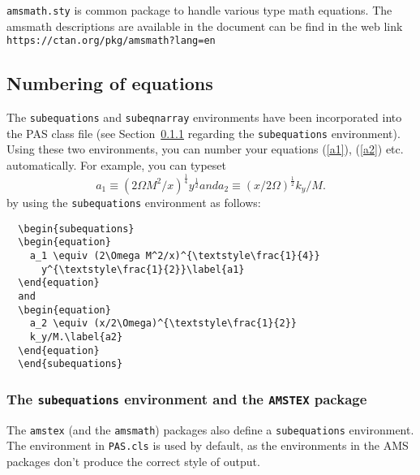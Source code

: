 \documentclass{pas}
\begin{document}
\verb"amsmath.sty" is common package to handle various type math equations. The amsmath descriptions are available in the document can be find in the web link \verb"https://ctan.org/pkg/amsmath?lang=en"

\subsection{Numbering of equations}

The \verb"subequations" and \verb"subeqnarray" environments have been
incorporated into the PAS class file (see Section~\ref{sub:amstex} regarding
the \verb"subequations" environment). Using these two environments,
you can number your equations (\ref{a1}), (\ref{a2}) etc. automatically.
For example, you can typeset
  \begin{subequations}
  \begin{equation}
    a_1 \equiv (2\Omega M^2/x)^{\textstyle\frac{1}{4}}
      y^{\textstyle\frac{1}{2}}\label{a1}
  \end{equation}
  and
  \begin{equation}
    a_2 \equiv (x/2\Omega)^{\textstyle\frac{1}{2}}k_y/M.\label{a2}
  \end{equation}
  \end{subequations}
by using the \verb"subequations" environment as follows:
%
\begin{verbatim}
  \begin{subequations}
  \begin{equation}
    a_1 \equiv (2\Omega M^2/x)^{\textstyle\frac{1}{4}}
      y^{\textstyle\frac{1}{2}}\label{a1}
  \end{equation}
  and
  \begin{equation}
    a_2 \equiv (x/2\Omega)^{\textstyle\frac{1}{2}}
    k_y/M.\label{a2}
  \end{equation}
  \end{subequations}
\end{verbatim}

\subsubsection{The \texttt{subequations} environment and the
  \texttt{AMSTEX} package} \label{sub:amstex}

The \verb"amstex" (and the \verb"amsmath") packages also define a
\verb"subequations" environment.  The environment in \verb"PAS.cls" is used
by default, as the environments in the AMS packages don't produce the correct
style of output.
\end{document}
